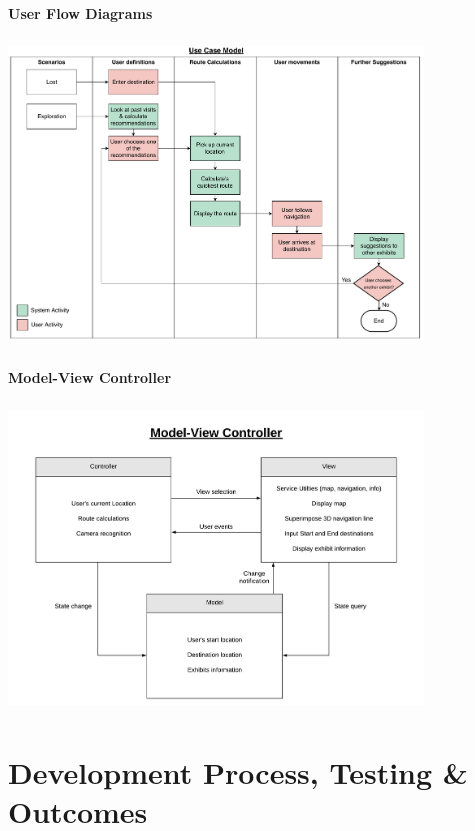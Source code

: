 \documentclass[compress]{beamer}
\begin{document}
	\begin{frame}
		\framesubtitle{User Flow Diagrams}
		\begin{center}
		\includegraphics[width=110mm, height=80mm]{use_case.pdf}
		\end{center}
	\end{frame}

	\begin{frame}
		\framesubtitle{Model-View Controller}
		\begin{center}
		\includegraphics[width=110mm, height=80mm]{mvc.pdf}
		\end{center}
	\end{frame}

	\section{Development Process, Testing \& Outcomes}
\end{document}

